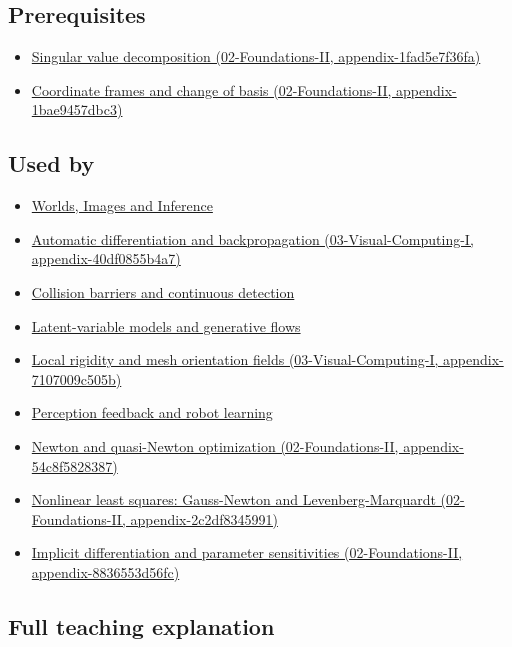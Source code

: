 \subsection{Prerequisites}\label{prerequisites}

\begin{itemize}
\tightlist
\item
  \href{}{Singular value decomposition (02-Foundations-II, appendix-1fad5e7f36fa)}
\item
  \href{}{Coordinate frames and change of basis (02-Foundations-II, appendix-1bae9457dbc3)}
\end{itemize}

\subsection{Used by}\label{used-by}

\begin{itemize}
\item
  \href{Continuous\%20Notes/University\%20-\%20Worlds,\%20Images\%20and\%20Inference\%20-\%20Graphics,\%20Vision\%20and\%20Photography}{Worlds, Images and Inference}
\item
  \href{}{Automatic differentiation and backpropagation (03-Visual-Computing-I, appendix-40df0855b4a7)}
\item
  \hyperref[appendix-a9ba01fa72a6]{Collision barriers and continuous detection}
\item
  \hyperref[appendix-2c568f05ee34]{Latent-variable models and generative flows}
\item
  \href{}{Local rigidity and mesh orientation fields (03-Visual-Computing-I, appendix-7107009c505b)}
\item
  \hyperref[appendix-b0c42da325f1]{Perception feedback and robot learning}
\item
  \href{}{Newton and quasi-Newton optimization (02-Foundations-II, appendix-54c8f5828387)}
\item
  \href{}{Nonlinear least squares: Gauss-Newton and Levenberg-Marquardt (02-Foundations-II, appendix-2c2df8345991)}
\item
  \href{}{Implicit differentiation and parameter sensitivities (02-Foundations-II, appendix-8836553d56fc)}
\end{itemize}

\subsection{Full teaching explanation}\label{full-teaching-explanation}

